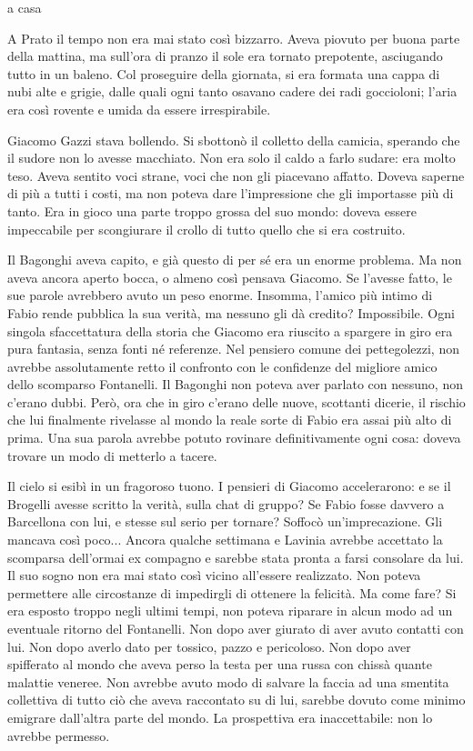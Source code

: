 a casa


A Prato il tempo non era mai stato così bizzarro. Aveva piovuto per buona parte della mattina, ma sull'ora di pranzo il sole era tornato prepotente, asciugando tutto in un baleno. Col proseguire della giornata, si era formata una cappa di nubi alte e grigie, dalle quali ogni tanto osavano cadere dei radi goccioloni; l'aria era così rovente e umida da essere irrespirabile.

Giacomo Gazzi stava bollendo. Si sbottonò il colletto della camicia, sperando che il sudore non lo avesse macchiato. Non era solo il caldo a farlo sudare: era molto teso. Aveva sentito voci strane, voci che non gli piacevano affatto. Doveva saperne di più a tutti i costi, ma non poteva dare l'impressione che gli importasse più di tanto. Era in gioco una parte troppo grossa del suo mondo: doveva essere impeccabile per scongiurare il crollo di tutto quello che si era costruito.

Il Bagonghi aveva capito, e già questo di per sé era un enorme problema. Ma non aveva ancora aperto bocca, o almeno così pensava Giacomo. Se l'avesse fatto, le sue parole avrebbero avuto un peso enorme. Insomma, l'amico più intimo di Fabio rende pubblica la sua verità, ma nessuno gli dà credito? Impossibile. Ogni singola sfaccettatura della storia che Giacomo era riuscito a spargere in giro era pura fantasia, senza fonti né referenze. Nel pensiero comune dei pettegolezzi, non avrebbe assolutamente retto il confronto con le confidenze del migliore amico dello scomparso Fontanelli. Il Bagonghi non poteva aver parlato con nessuno, non c'erano dubbi. Però, ora che in giro c'erano delle nuove, scottanti dicerie, il rischio che lui finalmente rivelasse al mondo la reale sorte di Fabio era assai più alto di prima. Una sua parola avrebbe potuto rovinare definitivamente ogni cosa: doveva trovare un modo di metterlo a tacere.

Il cielo si esibì in un fragoroso tuono. I pensieri di Giacomo accelerarono: e se il Brogelli avesse scritto la verità, sulla chat di gruppo? Se Fabio fosse davvero a Barcellona con lui, e stesse sul serio per tornare? Soffocò un'imprecazione. Gli mancava così poco... Ancora qualche settimana e Lavinia avrebbe accettato la scomparsa dell'ormai ex compagno e sarebbe stata pronta a farsi consolare da lui. Il suo sogno non era mai stato così vicino all'essere realizzato. Non poteva permettere alle circostanze di impedirgli di ottenere la felicità. Ma come fare? Si era esposto troppo negli ultimi tempi, non poteva riparare in alcun modo ad un eventuale ritorno del Fontanelli. Non dopo aver giurato di aver avuto contatti con lui. Non dopo averlo dato per tossico, pazzo e pericoloso. Non dopo aver spifferato al mondo che aveva perso la testa per una russa con chissà quante malattie veneree. Non avrebbe avuto modo di salvare la faccia ad una smentita collettiva di tutto ciò che aveva raccontato su di lui, sarebbe dovuto come minimo emigrare dall'altra parte del mondo. La prospettiva era inaccettabile: non lo avrebbe permesso.

